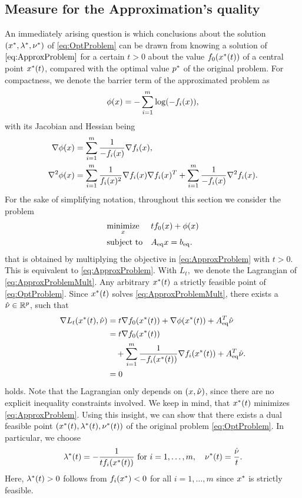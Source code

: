 \subsection{Measure for the Approximation's quality}
An immediately arising question is which conclusions about the solution $ (x^*,\lambda^*, \nu^*) $ of \eqref{eq:OptProblem} can be drawn from knowing a solution of $ \eqref{eq:ApproxProblem} $ for a certain $ t>0 $ about the value $ f_0(x^*(t)) $  of a central point $ x^*(t) $, compared with the optimal value $ p^* $ of the original problem. 
For compactness, we denote the barrier term of the approximated problem as
\[ \phi(x) = - \sum_{i=1}^{m} \log(-f_i(x)),\] with its Jacobian and Hessian being
\begin{align*}
	\nabla \phi(x)&= \sum_{i=1}^{m} \frac{1}{-f_i(x)} \nabla f_i(x),\\
	\nabla^2 \phi(x) &= \sum_{i=1}^{m} \frac{1}{f_i(x)^2} \nabla f_i(x) \nabla f_i(x)^T + \sum_{i=1}^{m}\frac{1}{-f_i(x)} \nabla^2 f_i (x).
\end{align*}
For the sake of simplifying notation, throughout this section we consider the problem
\begin{equation}
	\begin{aligned} & \underset{x}{\text{minimize}} & & tf_0(x) + \phi(x) \\ & \text{subject to} & &{A}_{\mathrm{eq}} x = {b}_{\mathrm{eq}}. \end{aligned} \label{eq:ApproxProblemMult}
\end{equation}
that is obtained by multiplying the objective in \eqref{eq:ApproxProblem} with $ t>0 $. This is equivalent to \eqref{eq:ApproxProblem}. With $ L_t, $ we denote the Lagrangian of \eqref{eq:ApproxProblemMult}.
Any arbitrary $ x^*(t) $ a strictly feasible point of \eqref{eq:OptProblem}. Since $ x^*(t) $ solves \eqref{eq:ApproxProblemMult}, there exists a $ \hat{\nu} \in \mathbb{R}^p$, such that\\

\begin{align}
	\nabla L_t(x^*(t), \hat{\nu}) &= t \nabla f_0(x^*(t)) + \nabla \phi(x^*(t)) + {A}_{\mathrm{eq}} ^T \hat{\nu}\\
					&= t\nabla f_0 (x^*(t)) \notag\\&\quad+ \sum_{i=1}^{m} \frac{1}{-f_i(x^*(t))} \nabla f_i(x^*(t)) + {A}_{\mathrm{eq}}^T \hat{\nu}.\\&=0
					\label{eq:centralPathLagr}
\end{align}
holds. Note that  the Lagrangian only depends on $ (x,\hat{\nu}) $, since there are no explicit inequality constraints involved. We keep in mind, that $ x^*(t) $ minimizes \eqref{eq:ApproxProblem}.
Using this insight, we can show that there exists a dual feasible point $ (x^*(t),\lambda^*(t), \nu^*(t)) $ of the original problem \eqref{eq:OptProblem}. In particular, we choose
\begin{gather*}
	\lambda^*(t) = -\frac{1}{tf_i(x^*(t))}\text{ for }i=1,\dots,m,\quad \nu^*(t)= \frac{\hat{\nu}}{t}.
\end{gather*}
Here, $ \lambda^*(t) > 0 $ follows from $ f_i(x^*) < 0 $ for all $ i = 1,\dots,m $ since $ x^*  $ is strictly feasible.


